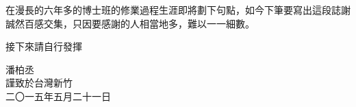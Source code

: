 
在漫長的六年多的博士班的修業過程生涯即將劃下句點，如今下筆要寫出這段誌謝誠然百感交集，只因要感謝的人相當地多，難以一一細數。

接下來請自行發揮

\hspace{3em}

\begin{flushright}

潘柏丞\\
謹致\;\;於台灣新竹\\
二〇一五年五月二十一日
\end{flushright}




